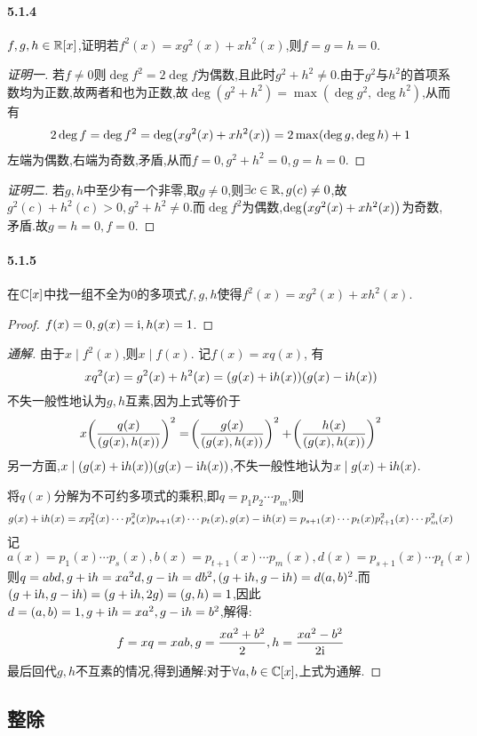 \documentclass[11pt]{article}
\begin{document}
\paragraph{5.1.4}$f,g,h\in \mathbb{R}[x]$,证明若$f^2(x)=xg^2(x)+xh^2(x)$,则$f=g=h=0$.
\begin{proof}[证明一]
    若$f\neq 0$则$\deg f^2=2\deg f$为偶数,且此时$g^2+h^2\neq 0$.由于$g^2$与$h^2$的首项系数均为正数,故两者和也为正数,故$\deg(g^2+h^2)=\max(\deg g^2,\deg h^2)$,从而有
    $$2\deg f=\deg f^2=\deg\!\left(xg^2(x)+xh^2(x)\right)=2\max(\deg g,\deg h)+1$$
    左端为偶数,右端为奇数,矛盾,从而$f=0,g^2+h^2=0,g=h=0$.
\end{proof}
\begin{proof}[证明二]
    若$g,h$中至少有一个非零,取$g\neq 0$,则$\exists c\in\mathbb{R}, g(c)\neq 0$,故$g^2(c)+h^2(c)>0, g^2+h^2\neq 0$.而$\deg f^2$为偶数,$\deg\!\left(xg^2(x)+xh^2(x)\right)$为奇数,矛盾.故$g=h=0,f=0$.
\end{proof}
\paragraph{5.1.5}在$\mathbb{C}[x]$中找一组不全为0的多项式$f,g,h$使得$f^2(x)=xg^2(x)+xh^2(x)$.
\begin{proof}
    $f(x)=0, g(x)=\mathrm{i}, h(x)=1$.
\end{proof}
\begin{proof}[通解]
    由于$x\mid f^2(x)$,则$x\mid f(x)$. 记$f(x)=xq(x)$, 有
    $$xq^2(x)=g^2(x)+h^2(x)=(g(x)+\mathrm{i} h(x))(g(x)-\mathrm{i} h(x))$$
    不失一般性地认为$g,h$互素,因为上式等价于
    $$x\!\left(\frac{q(x)}{(g(x),h(x))}\right)^2=\!\left(\frac{g(x)}{(g(x),h(x))}\right)^2+\!\left(\frac{h(x)}{(g(x),h(x))}\right)^2$$
    另一方面,$x\mid (g(x)+\mathrm{i} h(x))(g(x)-\mathrm{i} h(x))$,不失一般性地认为$x\mid g(x)+\mathrm{i} h(x)$.
    
    将$q(x)$分解为不可约多项式的乘积,即$q=p_1p_2\cdots p_m$,则
    $$g(x)+\mathrm{i} h(x)=xp_1^2(x)\cdots p_{s}^2(x) p_{s+1}(x)\cdots p_{t}(x), g(x)-\mathrm{i} h(x)=p_{s+1}(x)\cdots p_{t}(x)p_{t+1}^2(x)\cdots p_{m}^2(x)$$
    记
    $$a(x)=p_1(x)\cdots p_{s}(x), b(x)=p_{t+1}(x)\cdots p_{m}(x), d(x)=p_{s+1}(x)\cdots p_{t}(x)$$
    则$q=abd, g+\mathrm{i} h=x a^2d, g-\mathrm{i} h=db^2, (g+\mathrm{i} h, g-\mathrm{i} h)=d(a,b)^2$.而
    $(g+\mathrm{i} h, g-\mathrm{i} h)=(g+\mathrm{i} h, 2g)=(g,h)=1$,因此$d=(a,b)=1, g+\mathrm{i} h=x a^2, g-\mathrm{i} h=b^2$,解得:
    $$f=xq=xab, g=\frac{x a^2+b^2}{2}, h=\frac{x a^2-b^2}{2\mathrm{i}}$$
    最后回代$g,h$不互素的情况,得到通解:对于$\forall a,b\in \mathbb{C}[x],$上式为通解.
\end{proof}

\newpage
\subsection{整除}
\end{document}
